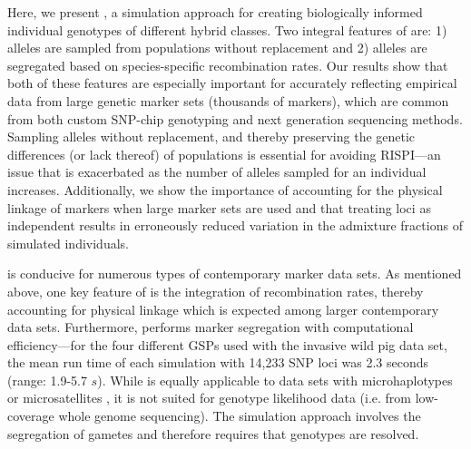 {Here, we present \gscramble{}, a simulation approach for creating biologically informed individual 
genotypes of different hybrid classes. Two integral features of \gscramble{} are: 
1) alleles are sampled from populations without replacement and 
2) alleles are segregated based on species-specific recombination rates. 
Our results show that both 
of these features are especially important for accurately reflecting empirical data from large genetic 
marker sets (thousands of markers), 
which are common from  both custom SNP-chip genotyping and next generation sequencing methods. Sampling alleles without 
replacement, and thereby preserving the genetic differences (or lack thereof) of populations is 
essential for avoiding RISPI---an issue that is exacerbated as the number of 
alleles sampled for an individual increases. Additionally, we show the importance of accounting for 
the physical linkage of markers when large marker sets are used and that treating loci as 
independent results in erroneously reduced variation in the admixture 
fractions of simulated individuals.

\gscramble{} is conducive for numerous types of contemporary marker data sets. As mentioned above, 
one key feature of \gscramble{} is the integration of recombination rates, thereby accounting for physical 
linkage which is expected among larger contemporary data sets. Furthermore, \gscramble{} performs marker 
segregation with computational efficiency---for the four different GSPs used with the invasive wild pig data set, 
the mean run time of each simulation with 14,233 SNP loci was 2.3 seconds (range: 1.9-5.7 $s$). 
While \gscramble{} is equally applicable to data sets with 
microhaplotypes \citep{baetscher2018microhaplotypes} or microsatellites \citep{zhan2017megasat}, 
it is not suited for genotype likelihood data (i.e. from low-coverage whole genome sequencing). 
The \gscramble{} simulation approach involves the segregation of gametes and therefore requires 
that genotypes are resolved. 

}
